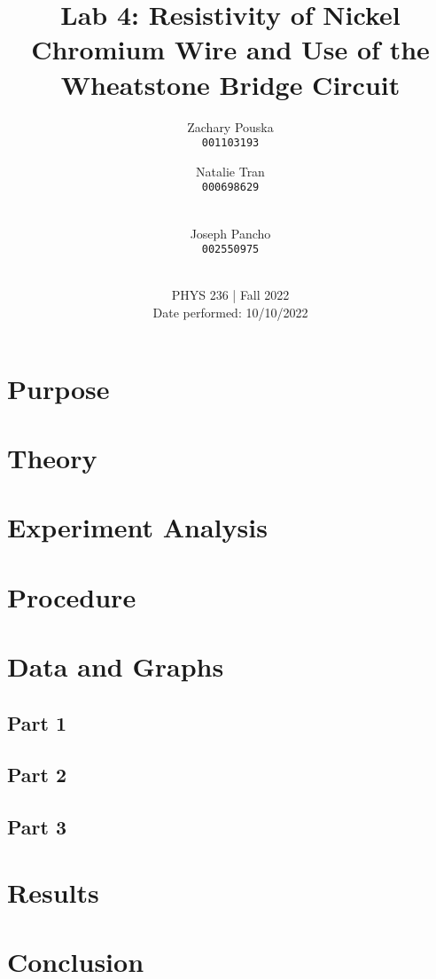 \documentclass[titlepage]{article}
\begin{document}
\title{\textbf{Lab 4: Resistivity of Nickel Chromium Wire and Use of the Wheatstone Bridge Circuit}}
\author{
    Zachary Pouska\\
    \texttt{001103193}\\
    \and
    Natalie Tran \\ 
    \texttt{000698629}\\ \\
    \and
    Joseph Pancho\\
    \texttt{002550975} \\ \\
} 

\date{PHYS 236 | Fall 2022\\
Date performed: 10/10/2022}


	\maketitle



	\section{Purpose}
    

	\section{Theory}	
	\section{Experiment Analysis}
    



	\section{Procedure}




	\section{Data and Graphs}
	\subsection{Part 1}
	\subsection{Part 2} 
	\subsection{Part 3}
	\section{Results}

	\section{Conclusion}
\end{document}
